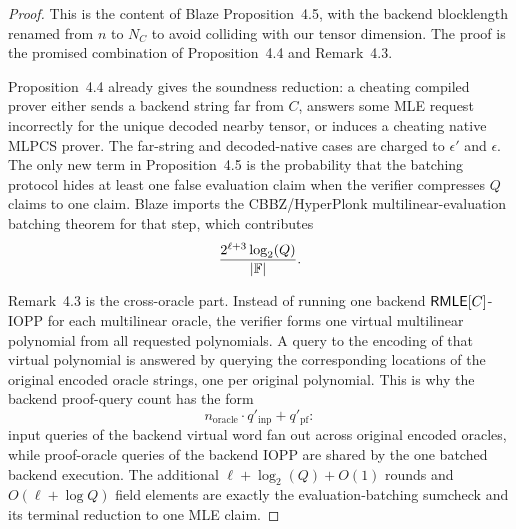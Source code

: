 \begin{proof}
This is the content of Blaze Proposition~4.5, with the backend blocklength
renamed from \(n\) to \(N_C\) to avoid colliding with our tensor dimension.
The proof is the promised combination of Proposition~4.4 and Remark~4.3.

Proposition~4.4 already gives the soundness reduction: a cheating compiled
prover either sends a backend string far from \(C\), answers some MLE request
incorrectly for the unique decoded nearby tensor, or induces a cheating native
MLPCS prover.  The far-string and decoded-native cases are charged to
\(\epsilon'\) and \(\epsilon\).  The only new term in Proposition~4.5 is the
probability that the batching protocol hides at least one false evaluation
claim when the verifier compresses \(Q\) claims to one claim.  Blaze imports
the CBBZ/HyperPlonk multilinear-evaluation batching theorem for that step,
which contributes
\[
  \frac{2^{\ell+3}\log_2(Q)}{|\mathbb{F}|}.
\]

Remark~4.3 is the cross-oracle part.  Instead of running one backend
\(\mathsf{RMLE}[C]\)-IOPP for each multilinear oracle, the verifier forms one virtual
multilinear polynomial from all requested polynomials.  A query to the encoding
of that virtual polynomial is answered by querying the corresponding locations
of the original encoded oracle strings, one per original polynomial.  This is
why the backend proof-query count has the form
\[
  n_{\mathrm{oracle}}\cdot q'_{\mathrm{inp}}+q'_{\mathrm{pf}}:
\]
input queries of the backend virtual word fan out across original encoded
oracles, while proof-oracle queries of the backend IOPP are shared by the one
batched backend execution.  The additional \(\ell+\log_2(Q)+O(1)\) rounds and
\(O(\ell+\log Q)\) field elements are exactly the evaluation-batching
sumcheck and its terminal reduction to one MLE claim.
\end{proof}

